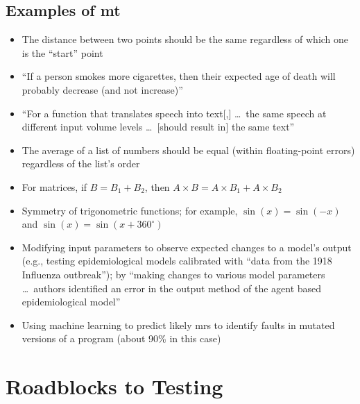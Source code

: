\subsection[Examples of MT]{Examples of \acs{mt}}
\begin{itemize}
    \item The distance between two points should be the same regardless of
          which one is the ``start'' point \citep[p.~22]{IEEE2021}
    \item ``If a person smokes more cigarettes, then their expected age of
          death will probably decrease (and not increase)''
          \citep[p.~22]{IEEE2021}
    \item ``For a function that translates speech into text[,] \dots\ the
          same speech at different input volume levels \dots\ [should result
          in] the same text'' \citep[p.~22]{IEEE2021}
    \item The average of a list of numbers should be equal (within
          floating-point errors) regardless of the list's order
          \citep[p.~67]{KanewalaAndYuehChen2019}
    \item For matrices, if $B = B_1 + B_2$, then $A \times B = A \times B_1
              + A \times B_2$ \citep[pp.~68-69]{KanewalaAndYuehChen2019}
    \item Symmetry of trigonometric functions; for example, $\sin(x) = \sin(-x)$
          and $\sin(x) = \sin(x + 360^{\circ})$ \citep[p.~70]{KanewalaAndYuehChen2019}
    \item Modifying input parameters to observe expected changes to a model's
          output (e.g., testing epidemiological models calibrated with
          ``data from the 1918 Influenza outbreak''); by ``making changes to
          various model parameters \dots\ authors identified an error in the
          output method of the agent based epidemiological model''
          \citep[p.~70]{KanewalaAndYuehChen2019}
    \item Using machine learning to predict likely \acsp{mr} to identify
          faults in mutated versions of a program (about 90\% in this case)
          \citep[p.~71]{KanewalaAndYuehChen2019}
\end{itemize}

\section{Roadblocks to Testing}

